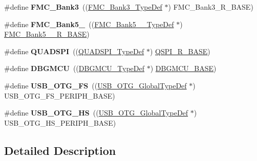 \begin{DoxyCompactItemize}
\item 
\#define {\bfseries F\+M\+C\+\_\+\+Bank3}~((\hyperlink{struct_f_m_c___bank3___type_def}{F\+M\+C\+\_\+\+Bank3\+\_\+\+Type\+Def} $\ast$) F\+M\+C\+\_\+\+Bank3\+\_\+\+R\+\_\+\+B\+A\+SE)\hypertarget{group___peripheral__declaration_ga208aba2ade94120efe3b94348e980890}{}\label{group___peripheral__declaration_ga208aba2ade94120efe3b94348e980890}

\item 
\#define {\bfseries F\+M\+C\+\_\+\+Bank5\+\_}~((\hyperlink{struct_f_m_c___bank5__6___type_def}{F\+M\+C\+\_\+\+Bank5\+\_\+\_\+\+Type\+Def} $\ast$) \hyperlink{group___peripheral__memory__map_gace117149a4fc0d07c38cc997fe4c4a73}{F\+M\+C\+\_\+\+Bank5\+\_\+\_\+\+R\+\_\+\+B\+A\+SE})\hypertarget{group___peripheral__declaration_gae3dcd4e05d7b9ffd6af1bd6c0d4f6960}{}\label{group___peripheral__declaration_gae3dcd4e05d7b9ffd6af1bd6c0d4f6960}

\item 
\#define {\bfseries Q\+U\+A\+D\+S\+PI}~((\hyperlink{struct_q_u_a_d_s_p_i___type_def}{Q\+U\+A\+D\+S\+P\+I\+\_\+\+Type\+Def} $\ast$) \hyperlink{group___peripheral__memory__map_ga3b6b7d9c67dec50557fd634505198e9d}{Q\+S\+P\+I\+\_\+\+R\+\_\+\+B\+A\+SE})\hypertarget{group___peripheral__declaration_gac7fb6e7a090282458855473a93385f66}{}\label{group___peripheral__declaration_gac7fb6e7a090282458855473a93385f66}

\item 
\#define {\bfseries D\+B\+G\+M\+CU}~((\hyperlink{struct_d_b_g_m_c_u___type_def}{D\+B\+G\+M\+C\+U\+\_\+\+Type\+Def} $\ast$) \hyperlink{group___peripheral__memory__map_ga4adaf4fd82ccc3a538f1f27a70cdbbef}{D\+B\+G\+M\+C\+U\+\_\+\+B\+A\+SE})\hypertarget{group___peripheral__declaration_ga92ec6d9ec2251fda7d4ce09748cd74b4}{}\label{group___peripheral__declaration_ga92ec6d9ec2251fda7d4ce09748cd74b4}

\item 
\#define {\bfseries U\+S\+B\+\_\+\+O\+T\+G\+\_\+\+FS}~((\hyperlink{struct_u_s_b___o_t_g___global_type_def}{U\+S\+B\+\_\+\+O\+T\+G\+\_\+\+Global\+Type\+Def} $\ast$) U\+S\+B\+\_\+\+O\+T\+G\+\_\+\+F\+S\+\_\+\+P\+E\+R\+I\+P\+H\+\_\+\+B\+A\+SE)\hypertarget{group___peripheral__declaration_ga9ebb053ee138fb47cdfede0e3371123d}{}\label{group___peripheral__declaration_ga9ebb053ee138fb47cdfede0e3371123d}

\item 
\#define {\bfseries U\+S\+B\+\_\+\+O\+T\+G\+\_\+\+HS}~((\hyperlink{struct_u_s_b___o_t_g___global_type_def}{U\+S\+B\+\_\+\+O\+T\+G\+\_\+\+Global\+Type\+Def} $\ast$) U\+S\+B\+\_\+\+O\+T\+G\+\_\+\+H\+S\+\_\+\+P\+E\+R\+I\+P\+H\+\_\+\+B\+A\+SE)\hypertarget{group___peripheral__declaration_ga820f5f7cb0a7af72a2444a1903fd83bc}{}\label{group___peripheral__declaration_ga820f5f7cb0a7af72a2444a1903fd83bc}

\end{DoxyCompactItemize}


\subsection{Detailed Description}
